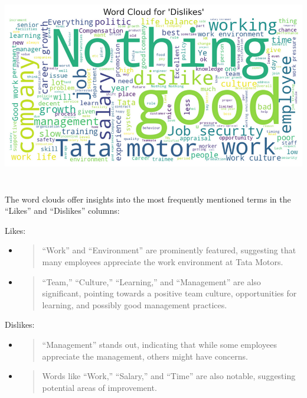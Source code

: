 \documentclass[
]{article}
\begin{document}
\includegraphics[width=5.26806in,height=3.41667in]{image7.png}

The word clouds offer insights into the most frequently mentioned terms
in the ``Likes'' and ``Dislikes'' columns:

Likes:

\begin{itemize}
\item
  \begin{quote}
  ``Work'' and ``Environment'' are prominently featured, suggesting that
  many employees appreciate the work environment at Tata Motors.
  \end{quote}
\item
  \begin{quote}
  ``Team,'' ``Culture,'' ``Learning,'' and ``Management'' are also
  significant, pointing towards a positive team culture, opportunities
  for learning, and possibly good management practices.
  \end{quote}
\end{itemize}

Dislikes:

\begin{itemize}
\item
  \begin{quote}
  ``Management'' stands out, indicating that while some employees
  appreciate the management, others might have concerns.
  \end{quote}
\item
  \begin{quote}
  Words like ``Work,'' ``Salary,'' and ``Time'' are also notable,
  suggesting potential areas of improvement.
  \end{quote}
\end{itemize}
\end{document}
